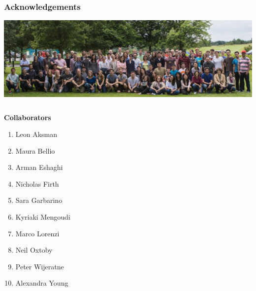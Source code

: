 \documentclass[8pt,xcolor=table]{beamer}
\begin{document}
\begin{frame}
\frametitle{Acknowledgements}

\includegraphics[width=\textwidth,trim=0 0 0 150, clip]{cmic_away_day}
 
 \begin{small}
\begin{columns}[T]
    \begin{column}{.45\textwidth}
    \textbf{Collaborators}
    \begin{enumerate}
     \item Leon Aksman
     \item Maura Bellio
     \item Arman Eshaghi
     \item Nicholas Firth
     \item Sara Garbarino
     \item Kyriaki Mengoudi 
     \item Marco Lorenzi
     \item Neil Oxtoby
     \item Peter Wijeratne
     \item Alexandra Young
    \end{enumerate}
    \end{column}
    

\end{columns}
\end{small}
\end{frame}
\end{document}
